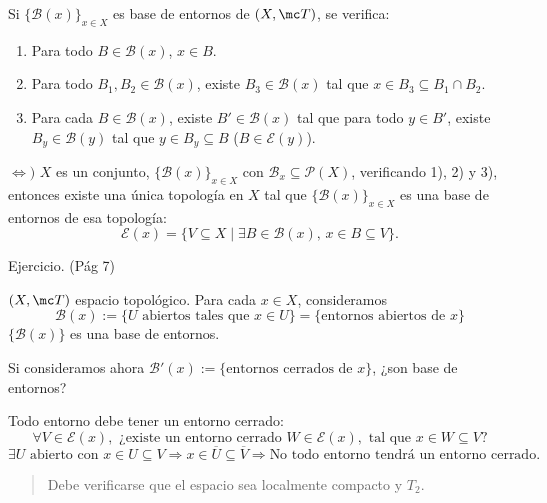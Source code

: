 Si \(\{\mathcal{B}(x)\}_{x \in X}\) es base de entornos de \((X, \mc T)\), se verifica:
\begin{enumerate}
    \item Para todo \(B \in \mathcal{B}(x)\), \(x \in B\).
    \item Para todo \(B_1, B_2 \in \mathcal{B}(x)\), existe \(B_3 \in \mathcal{B}(x)\) tal que \(x \in B_3 \subseteq B_1 \cap B_2\).
    \item Para cada \(B \in \mathcal{B}(x)\), existe \(B' \in \mathcal{B}(x)\) tal que para todo \(y \in B'\), existe \(B_y \in \mathcal{B}(y)\) tal que \(y \in B_y \subseteq B\) (\(B \in \mathcal{E}(y)\)).
\end{enumerate}


\begin{teo}
    \(\iff ) \) \(X\) es un conjunto, \(\{\mathcal{B}(x)\}_{x \in X}\) con \(\mathcal{B}_x \subseteq \mathcal{P}(X)\), verificando 1), 2) y 3), entonces existe una única topología en \(X\) tal que \(\{\mathcal{B}(x)\}_{x \in X}\) es una base de entornos de esa topología:
    \[
        \mathcal{E}(x) = \{ V \subseteq X \mid \exists B \in \mathcal{B}(x), \, x \in B \subseteq V \}.
    \]
\end{teo}

\begin{dem}
    Ejercicio. (Pág 7)
\end{dem}

\begin{ejem}
    \((X, \mc T)\) espacio topológico.   
    Para cada \(x \in X\), consideramos $$\mathcal{B}(x) := \{ U \text{ abiertos tales que } x \in U \} = \{ \text{entornos abiertos de } x \}$$
    \(\{\mathcal{B}(x)\}\) es una base de entornos.
    
    Si consideramos ahora \(\mathcal{B}'(x) := \{ \text{entornos cerrados de } x \}\), ¿son base de entornos?
    
    Todo entorno debe tener un entorno cerrado:
    \[
        \forall V \in \mathcal{E}(x), \text{ ¿existe un entorno cerrado } W \in \mathcal{E}(x), \text{ tal que } x \in W \subseteq V\text{?}
    \]
    \[
        \exists U \text{ abierto con } x \in U \subseteq V \Rightarrow x \in \overline{U} \subseteq \overline{V} \Rightarrow \text{No todo entorno tendrá un entorno cerrado.}
    \]
    \begin{quote}
        \small Debe verificarse que el espacio sea localmente compacto y \(T_2\).
    \end{quote}
\end{ejem}

